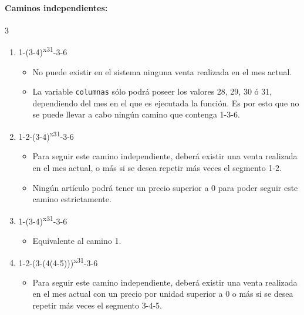 \paragraph{Caminos independientes:} 3
    \begin{enumerate}
        \item 1-(3-4)\textsuperscript{x31}-3-6
            \begin{itemize}
                \item No puede existir en el sistema ninguna venta realizada en el mes actual.
                \item La variable \texttt{columnas} sólo podrá poseer los valores 28, 29, 30 ó 31, dependiendo del mes en el que es ejecutada la función. Es por esto que no se puede llevar a cabo ningún camino que contenga 1-3-6.
            \end{itemize}
        \item 1-2-(3-4)\textsuperscript{x31}-3-6
            \begin{itemize}
                \item Para seguir este camino independiente, deberá existir  una venta realizada en el mes actual, o más si se desea repetir más veces el segmento 1-2.
                \item Ningún artículo podrá tener un precio superior a 0 para poder seguir este camino estrictamente.
            \end{itemize}
        \item 1-(3-4)\textsuperscript{x31}-3-6
            \begin{itemize}
                \item Equivalente al camino 1.
            \end{itemize}
        \item 1-2-(3-(4\textbar{}\textbar{}(4-5)))\textsuperscript{x31}-3-6
            \begin{itemize}
                \item Para seguir este camino independiente, deberá existir  una venta realizada en el mes actual con un precio por unidad superior a 0 o más si se desea repetir más veces el segmento 3-4-5.
            \end{itemize}
    \end{enumerate}